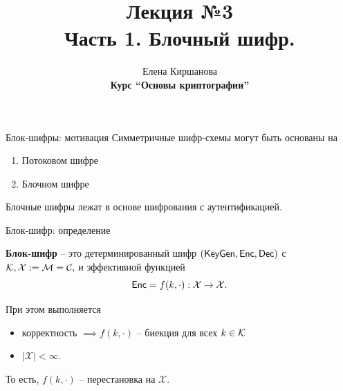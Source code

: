 \documentclass[usenames,dvipsnames,8pt,aspectratio=169]{beamer}
\title{Лекция №3 \\[10pt]
	Часть 1. Блочный шифр.}
\date{ Елена Киршанова \\  \textbf{Курс ``Основы криптографии''} \\  }
\begin{document}
	
\begin{frame}
	\titlepage
\end{frame}


\begin{frame}{Блок-шифры: мотивация}
\LARGE 
	Симметричные шифр-схемы могут быть основаны на
	
	\begin{enumerate}
		\itemsep 10pt
		\item Потоковом шифре 
		\item Блочном  шифре
	\end{enumerate}

	\vspace{20pt}
	Блочные шифры лежат в основе {\color{Orange} шифрования с аутентификацией.}
\end{frame}


\begin{frame}{Блок-шифр: определение}
\LARGE

		{\color{Orange}\textbf{Блок-шифр}} -- это {\color{Orange} детерминированный} шифр $(\textsf{KeyGen}, \textsf{Enc}, \textsf{Dec})$ с  $\mathcal{K}, \mathcal{X}:=\mathcal{M} = \mathcal{C}, $ и эффективной функцией
		\[
			\textsf{Enc} = f(k, \cdot): \mathcal{X} \rightarrow \mathcal{X}.
		\]
		
При этом выполняется
\begin{itemize}
	\item корректность $\implies f(k, \cdot)$ -- биекция для всех $k \in \mathcal{K}$ \\
	\item $|\mathcal{X}| < \infty$. \\
\end{itemize}

\vspace{20pt}

То есть, $f(k, \cdot)$ -- перестановка на $\mathcal{X}$. \\[10pt]


\end{frame}
\end{document}
